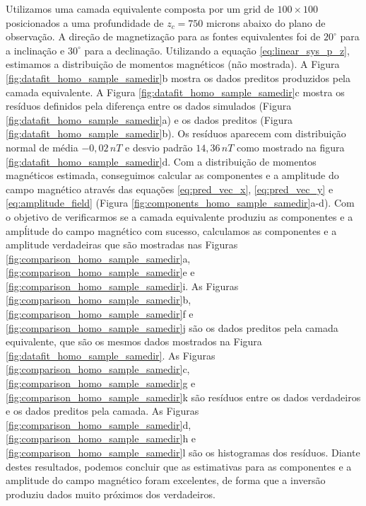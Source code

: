 Utilizamos uma camada equivalente composta por um grid de $100 \times 100$ posicionados a uma profundidade de $z_c = 750$ microns abaixo do plano de observação. A direção de magnetização para as fontes equivalentes foi de $20^\circ$ para a inclinação e $30^\circ$ para a declinação. Utilizando a equação \ref{eq:linear_sys_p_z}, estimamos a distribuição de momentos magnéticos (não mostrada). A Figura \ref{fig:datafit_homo_sample_samedir}b mostra os dados preditos produzidos pela camada equivalente. A Figura \ref{fig:datafit_homo_sample_samedir}c mostra os resíduos definidos pela diferença entre os dados simulados (Figura \ref{fig:datafit_homo_sample_samedir}a) e os dados preditos (Figura \ref{fig:datafit_homo_sample_samedir}b). Os resíduos aparecem com distribuição normal de média $-0,02 \, nT$ e desvio padrão $14,36 \, nT$ como mostrado na figura \ref{fig:datafit_homo_sample_samedir}d. Com a distribuição de momentos magnéticos estimada, conseguimos calcular as componentes e a amplitude do campo magnético através das equações \ref{eq:pred_vec_x}, \ref{eq:pred_vec_y} e \ref{eq:amplitude_field} (Figura \ref{fig:components_homo_sample_samedir}a-d). Com o objetivo de verificarmos se a camada equivalente produziu as componentes e a ampĺitude do campo magnético com sucesso, calculamos as componentes e a amplitude verdadeiras que são mostradas nas Figuras \ref{fig:comparison_homo_sample_samedir}a, \ref{fig:comparison_homo_sample_samedir}e e \ref{fig:comparison_homo_sample_samedir}i. As Figuras \ref{fig:comparison_homo_sample_samedir}b, \ref{fig:comparison_homo_sample_samedir}f e \ref{fig:comparison_homo_sample_samedir}j são os dados preditos pela camada equivalente, que são os mesmos dados mostrados na Figura \ref{fig:datafit_homo_sample_samedir}.
As Figuras \ref{fig:comparison_homo_sample_samedir}c, \ref{fig:comparison_homo_sample_samedir}g e \ref{fig:comparison_homo_sample_samedir}k são resíduos entre os dados verdadeiros e os dados preditos pela camada. As Figuras \ref{fig:comparison_homo_sample_samedir}d, \ref{fig:comparison_homo_sample_samedir}h e \ref{fig:comparison_homo_sample_samedir}l são os histogramas dos resíduos. Diante destes resultados, podemos concluir que as estimativas para as componentes e a amplitude do campo magnético foram excelentes, de forma que a inversão produziu dados muito próximos dos verdadeiros.  

